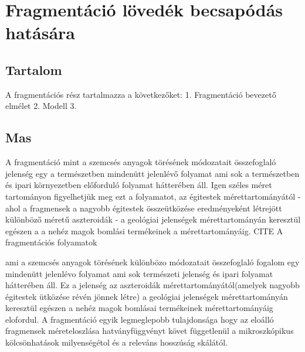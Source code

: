 \chapter{Fragmentáció lövedék becsapódás hatására}
\label{chapt:md}

\begin{comment}
Nos egyelőre annyit tudok, hogy itt egy picit bővebben ki kellene fejteni az ami a kb 10 oldalas cikkben benne van, meg kifejteni a modellt amit használok. Meglátjuk, hogy sikerül.
1.
Motiváció

2.
Modell
Gábor és Feri cikke alapján leírni a felhasznált modellt.
Ábrák:
-A rendetzetlenséget szemléltető ábra
-Hertz erő  a polygonokkal
-A rudak kölcsönhatását bemutató ábra

3.
Vizsgálatok  a fragmensek sebesség és tömegeloszlása

4.
Következtetések

\end{comment}

\section{Tartalom}

	A fragmentációs rész tartalmazza a következőket:
	1. Fragmentáció bevezető elmélet
	2. Modell
	3. 

\section{Mas}
A fragmentáció mint a szemcsés anyagok törésének módozatait összefoglaló jelenség egy a természetben mindenütt jelenlévő folyamat ami sok a természetben és ipari környezetben előforduló folyamat hátterében áll. Igen széles méret
tartományon figyelhetjük meg ezt a folyamatot, az égitestek mérettartományától - ahol a fragmensek a nagyobb égitestek összeütközése
eredményeként létrejött különböző méretű aszteroidák - a geológiai jelenségek mérettartományán keresztül egészen a 
a nehéz magok bomlási termékeinek a mérettartományáig. CITE
A fragmentációs folyamatok 


ami a szemcsés anyagok törésének különbözo módozatait összefoglaló fogalom
egy mindenütt jelenlévo folyamat ami sok természeti jelenség és ipari folyamat hátterében
áll. Ez a jelenség az aszteroidák mérettartományától(amelyek nagyobb égitestek ütközése 
révén jönnek létre) a geológiai jelenségek mérettartományán keresztül egészen a nehéz magok 
bomlásai termékeinek mérettartományáig elofordul. %
A fragmentáció egyik legmeglepobb tulajdonsága hogy az eloálló fragmensek méreteloszlása
hatványfüggvényt követ függetlenül a mikroszkópikus kölcsönhatások milyenségétol és a releváns
hosszúság skálától.

